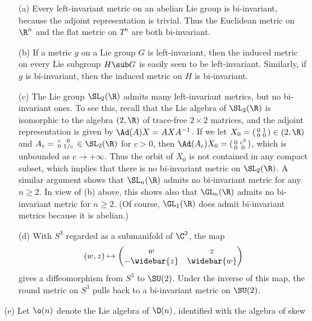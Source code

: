 \begin{example}
\mbox{}
\begin{itemize}
\item[(a)] Every left-invariant metric on an abelian Lie group is bi-invariant, because 
the adjoint representation is trivial. Thus the Euclidean metric on $\R^n$ and the flat 
metric on $T^n$ are both bi-invariant.
\item[(b)] If a metric $g$ on a Lie group $G$ is left-invariant, then the induced metric 
on every Lie subgroup $H\sub G$ is easily seen to be left-invariant. Similarly, if $g$ is
bi-invariant, then the induced metric on $H$ is bi-invariant.
\item[(c)] The Lie group $\SL_2(\R)$ admits many left-invariant metrics, but no bi-invariant 
ones. To see this, recall that the Lie algebra of $\SL_2(\R)$ is isomorphic to the algebra 
$\sl(2,\R)$ of trace-free $2\times 2$ matrices, and the adjoint representation is given by 
$\Ad(A)X=AXA^{-1}$. If we let $X_0=(\begin{smallmatrix}
0&1\\
0&0
\end{smallmatrix})\in\sl(2,\R)$ and $A_c=\begin{smallmatrix}
c&0\\
0&1/c
\end{smallmatrix}\in\SL_2(\R)$ for $c>0$, then $\Ad(A_c)X_0=(\begin{smallmatrix}
0&c^2\\
0&0
\end{smallmatrix})$, which is unbounded as $c\to+\infty$. Thus the orbit of $X_0$ is not 
contained in any compact subset, which implies that there is no bi-invariant metric on 
$\SL_2(\R)$. A similar argument shows that $\SL_n(\R)$ admits no bi-invariant metric for 
any $n\geq 2$. In view of (b) above, this shows also that $\GL_n(\R)$ admits no bi-invariant 
metric for $n\geq 2$. (Of course, $\GL_1(\R)$ does admit bi-invariant metrics because it is 
abelian.)
\item[(d)] With $S^3$ regarded as a submanifold of $\C^2$, the map 
\[(w,z)\mapsto\begin{pmatrix}
w&z\\
-\widebar{z}&\widebar{w}
\end{pmatrix}\]
gives a diffeomorphism from $S^3$ to $\SU(2)$. Under the inverse of this map, the round metric 
on $S^3$ pulls back to a bi-invariant metric on $\SU(2)$.
\end{itemize}
\item[(e)] Let $\o(n)$ denote the Lie algebra of $\O(n)$, identified with the algebra of skew 

\end{example}
